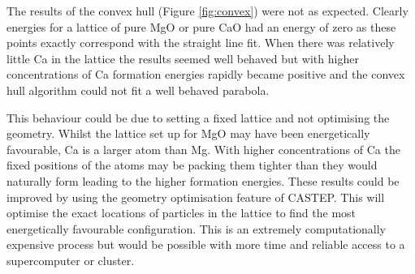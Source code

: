 \documentclass[a4paper,12pt]{article}
\begin{document}
\begin{multicols}{2}
    The results of the convex hull (Figure \ref{fig:convex}) were not as expected.  Clearly energies for a lattice of pure MgO or pure CaO had an energy of zero as these points exactly correspond with the straight line fit. When there was relatively little Ca in the lattice the results seemed well behaved but with higher concentrations of Ca formation energies rapidly became positive and the convex hull algorithm could not fit a well behaved parabola.
    
    This behaviour could be due to setting a fixed lattice and not optimising the geometry. Whilst the lattice set up for MgO may have been energetically favourable, Ca is a larger atom than Mg. With higher concentrations of Ca the fixed positions of the atoms may be packing them tighter than they would naturally form leading to the higher formation energies. These results could be improved by using the geometry optimisation feature of CASTEP. This will optimise the exact locations of particles in the lattice to find the most energetically favourable configuration. This is  an extremely computationally expensive process but would be possible with more time and reliable access to a supercomputer or cluster.
	


\end{multicols}
\end{document}
